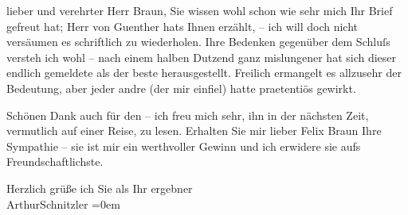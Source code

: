            \vspace{0.5em}
\pstart
           lieber und verehrter Herr Braun,  Sie wissen wohl schon wie sehr
               mich Ihr Brief gefreut hat; Herr von Guenther
               hats Ihnen erzählt, – ich will doch nicht versäumen es schriftlich zu wiederholen.
               Ihre Bedenken gegenüber dem Schluſs versteh ich wohl – nach einem halben Dutzend ganz
               mislungener hat sich dieser endlich gemeldete als der beste herausgestellt. Freilich
               ermangelt es allzusehr der Bedeutung, aber jeder andre (der mir einfiel) hatte
               praetentiös gewirkt.\pend
           
\pstart
           Schönen Dank auch für den \label{K_L02487-1v}\label{K_L02487-1} – ich freu mich sehr, ihn in der nächsten Zeit, vermutlich auf
               einer Reise, zu lesen. Erhalten Sie mir lieber Felix Braun Ihre Sympathie – {\pb}sie ist mir ein werthvoller Gewinn und ich
               erwidere sie aufs Freundschaftlichste.\pend
           
\pstart
           Herzlich grüße ich Sie als Ihr ergebner{\\[\baselineskip]}\spacefill\mbox{ArthurSchnitzler}\pend
           \leftskip=0em{}\endnumbering{}  \newcommand{\dateiname}{L02487}\newcommand{\titel}{Arthur Schnitzler an Felix Braun, 28. 5. 1927}\newcommand{\editorInnen}{Martin Anton Müller und Gerd-Hermann Susen}
